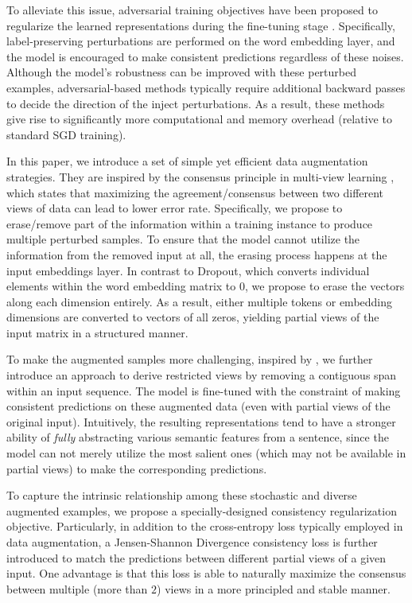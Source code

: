 \documentclass[11pt,a4paper]{article}
\begin{document}
To alleviate this issue, adversarial training objectives have been proposed to regularize the learned representations during the fine-tuning stage \cite{zhu2019freelb, liu2020adversarial, jiang2019smart}. Specifically, label-preserving perturbations are performed on the word embedding layer, and the model is encouraged to make consistent predictions regardless of these noises. Although the model's robustness can be improved with these perturbed examples, adversarial-based methods typically require additional backward passes to decide the direction of the inject perturbations. 
As a result, these methods give rise to significantly more computational and memory overhead (relative to standard SGD training).


In this paper, we introduce a set of simple yet efficient data augmentation strategies. They are inspired by the consensus principle in multi-view learning \cite{Blum1998CombiningLA, Xu2013ASO, Clark2018SemiSupervisedSM}, which states that maximizing the agreement/consensus between two different views of data can lead to lower error rate.
Specifically, we propose to erase/remove part of the information within a training instance to produce multiple perturbed samples. 
To ensure that the model cannot utilize the information from the removed input at all, the erasing process happens at the input embeddings layer.
In contrast to Dropout, which converts individual elements within the word embedding matrix to $0$, we propose to erase the vectors along each dimension entirely.
As a result, either multiple tokens or embedding dimensions are converted to vectors of all zeros, yielding partial views of the input matrix in a structured manner.  

To make the augmented samples more challenging, inspired by \cite{joshi2019spanbert}, we further introduce an approach to derive restricted views by removing a contiguous span within an input sequence.
The model is fine-tuned with the constraint of making consistent predictions on these augmented data (even with partial views of the original input).
Intuitively, the resulting representations tend to have a stronger ability of \emph{fully} abstracting various semantic features from a sentence, since the model can not merely utilize the most salient ones (which may not be available in partial views) to make the corresponding predictions.

To capture the intrinsic relationship among these stochastic and diverse augmented examples, we propose a specially-designed consistency regularization objective. Particularly, in addition to the cross-entropy loss typically employed in data augmentation, a Jensen-Shannon Divergence consistency loss is further introduced to match the predictions between different partial views of a given input. One advantage is that this loss is able to naturally maximize the consensus between multiple (more than $2$) views in a more principled and stable manner. 
\end{document}
